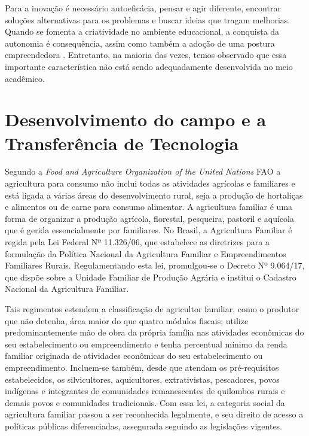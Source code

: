 Para a inovação é necessário autoeficácia, pensar e agir diferente, encontrar soluções alternativas para os problemas e buscar ideias que tragam melhorias. Quando se fomenta a criatividade no ambiente educacional, a conquista da autonomia é consequência, assim como também a adoção de uma postura empreendedora \cite{gonzalez_predictors_2009}. Entretanto, na maioria das vezes, temos observado que essa importante característica não está sendo adequadamente desenvolvida no meio acadêmico. 

\section{Desenvolvimento do campo e a Transferência de Tecnologia}

Segundo a \textit{Food and Agriculture Organization of the United Nations} FAO \cite{fao_panorama_2017} a agricultura para consumo não inclui todas as atividades agrícolas e familiares e está ligada a várias áreas do desenvolvimento rural, seja  a produção de hortaliças e alimentos ou de carne para consumo alimentar. A agricultura familiar é uma forma de organizar a produção agrícola, florestal, pesqueira, pastoril e aquícola que é gerida essencialmente por familiares. No Brasil, a Agricultura Familiar é regida pela Lei Federal Nº 11.326/06, que estabelece as diretrizes para a formulação da Política Nacional da Agricultura Familiar e Empreendimentos Familiares Rurais. Regulamentando esta lei, promulgou-se o Decreto Nº 9.064/17, que dispõe sobre a Unidade Familiar de Produção Agrária e institui o Cadastro Nacional da Agricultura Familiar. 

Tais regimentos estendem a classificação de agricultor familiar, como o produtor que não detenha, área maior do que quatro módulos fiscais; utilize predominantemente mão de obra da própria família nas atividades econômicas do seu estabelecimento ou empreendimento e tenha percentual mínimo da renda familiar originada de atividades econômicas do seu estabelecimento ou empreendimento. Incluem-se também, desde que atendam os pré-requisitos estabelecidos, os silvicultores, aquicultores, extrativistas, pescadores, povos indígenas e integrantes de comunidades remanescentes de quilombos rurais e demais povos e comunidades tradicionais. Com essa lei, a categoria social da agricultura familiar passou a ser reconhecida legalmente, e seu direito de acesso a políticas públicas diferenciadas, assegurada seguindo as legislações vigentes.

